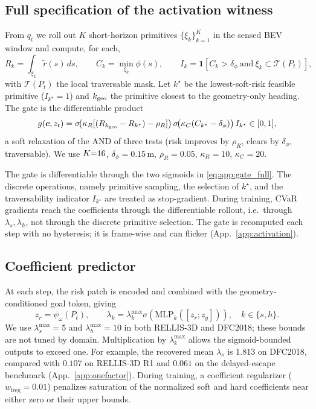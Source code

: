 \subsection{Full specification of the activation witness}
\label{app:gate}
From $q_t$ we roll out $K$ short-horizon primitives $\{\xi_k\}_{k=1}^K$ in the sensed BEV window and compute, for each,
\[
  R_k=\int_{\xi_k}\tilde r(s)\,ds,\qquad
  C_k=\min_{\xi_k}\phi(s),\qquad
  I_k=\mathbf 1[C_k>\delta_\phi\ \text{and}\ \xi_k\subset\mathcal T(P_t)],
\]
with $\mathcal T(P_t)$ the local traversable mask. Let $k^\star$ be the lowest-soft-risk feasible primitive ($I_{k^\star}{=}1$) and $k_{\rm geo}$ the primitive closest to the geometry-only heading. The gate is the differentiable product
\begin{equation}
  g(\vec c,z_t)=
  \sigma\!\bigl(\kappa_R[(R_{k_{\rm geo}}-R_{k^\star})-\rho_R]\bigr)\,
  \sigma\!\bigl(\kappa_C(C_{k^\star}-\delta_\phi)\bigr)\,I_{k^\star}\in[0,1],
  \label{eq:app:gate_full}
\end{equation}
a soft relaxation of the AND of three tests (risk improves by $\rho_R$, clears by $\delta_\phi$, traversable). We use $K{=}\Kdef$, $\delta_\phi{=}0.15$\,m, $\rho_R{=}0.05$, $\kappa_R{=}10$, $\kappa_C{=}20$.

The gate is differentiable through the two sigmoids in \eqref{eq:app:gate_full}. The discrete operations, namely primitive sampling, the selection of $k^\star$, and the traversability indicator $I_{k^\star}$ are treated as stop-gradient. During training, CVaR gradients reach the coefficients through the differentiable rollout, i.e.\ through $\lambda_s,\lambda_h$, not through the discrete primitive selection. The gate is recomputed each step with no hysteresis; it is frame-wise and can flicker (App.~\ref{app:activation}).

\subsection{Coefficient predictor}
\label{app:coeff_pred}

At each step, the risk patch is encoded and combined with the
geometry-conditioned goal token, giving
\begin{equation}
  z_r=\psi_\omega(P_t),\qquad
  \lambda_k=\lambda_k^{\max}
  \sigma\!\left(\mathrm{MLP}_k([z_r;z_g])\right),
  \quad k\in\{s,h\}.
  \label{eq:app:coeff}
\end{equation}
We use $\lambda_s^{\max}=5$ and $\lambda_h^{\max}=10$ in both RELLIS-3D
and DFC2018; these bounds are not tuned by domain. Multiplication by
$\lambda_k^{\max}$ allows the sigmoid-bounded outputs to exceed one. For
example, the recovered mean $\lambda_s$ is $1.813$ on DFC2018, compared with
$0.107$ on RELLIS-3D R1 and $0.061$ on the delayed-escape benchmark
(App.~\ref{app:onefactor}). During training, a coefficient regularizer
($w_{\mathrm{lreg}}=0.01$) penalizes saturation of the normalized soft and
hard coefficients near either zero or their upper bounds.

